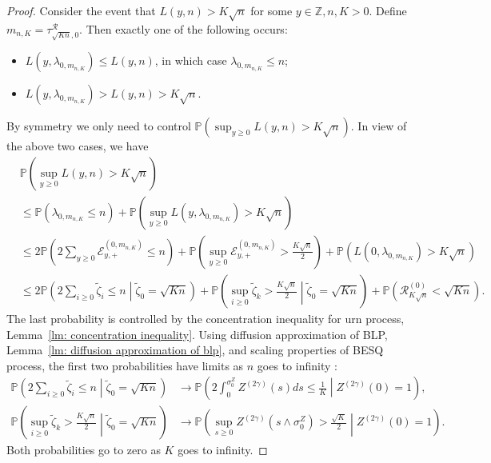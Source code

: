 \documentclass[EJP]{ejpecp} %
\begin{document}
\begin{proof}
	Consider the event that $L(y, n) > K \sqrt{n} $ for some $y \in \mathbb{Z}, n, K > 0$. Define $m_{n, K } = \tau^{\mathscr{R}}_{\sqrt{K n},0 }$. Then exactly one of the following occurs:
	\begin{itemize}
		\item $L(y, \lambda_{0, m_{n, K}}) \le L(y, n)$, in which case $\lambda_{0, m_{n, K}} \le  n$;
		\item $L(y, \lambda_{0, m_{n, K}}) >  L(y, n)  > K \sqrt{n} $.
	\end{itemize}
	By symmetry we only need to control $\mathbb{P}\left( \sup _{y \ge  0} L(y, n) > K \sqrt{n}  \right) $. In view of the above two cases, we have
	\begin{align*}
		&\mathbb{P}\left( \sup _{y \ge  0} L(y, n) > K \sqrt{n}  \right) \\
		&\le \mathbb{P}\left( \lambda_{0, m_{n, K}} \le n \right) + \mathbb{P}\left( \sup _{y \ge 0} L\left( y, \lambda_{0, m_{n, K}}\right)   > K \sqrt{n}  \right)  \\
		&\le 2\mathbb{P}\left( 2 \sum_{y \ge 0} \mathcal{E}_{y, +}^{(0,m_{n, K})} \le n \right) + \mathbb{P}\left( \sup _{y \ge 0} \mathcal{E}_{y,+}^{\left( 0,m_{n, K} \right) }   > \frac{K \sqrt{n} }{2}  \right)+ \mathbb{P}\left( L(0,\lambda_{0, m_{n, K}}) > K \sqrt{n}  \right)  \\
		&\le 
		2\mathbb{P}\left( 2 \sum_{i \ge  0} \tilde \zeta_i \le  n \middle| \tilde\zeta_0 = \sqrt{K n} \right) + 
		\mathbb{P}\left( \sup _{i \ge 0} \tilde \zeta_k > \frac{K \sqrt{n} }{2} \middle| \tilde \zeta_0 = \sqrt{K n}   \right)+ 
		\mathbb{P}\left( \mathscr{R}^{(0)} _{K \sqrt{n} } < \sqrt{K n}  \right) 
		.\end{align*}
	The last probability is controlled by the concentration inequality for urn process, Lemma~\ref{lm: concentration inequality}. Using diffusion approximation of BLP, Lemma~\ref{lm: diffusion approximation of blp}, and scaling properties of BESQ process, the first two probabilities have limits as $n$ goes to infinity :
	\begin{align*}
		\mathbb{P}\left( 2 \sum_{i \ge  0} \tilde \zeta_i \le  n \middle| \tilde\zeta_0 = \sqrt{K n} \right) 
		&\to 
		\mathbb{P}\left(2 \int _0^{\sigma_0^{Z}} Z^{(2 \gamma)}(s) d s \le \frac{1}{K} \middle| Z^{(2 \gamma)}(0) = 1 \right),\\
		\mathbb{P}\left( \sup _{i \ge 0} \tilde \zeta_k > \frac{K \sqrt{n} }{2} \middle| \tilde \zeta_0 = \sqrt{K n}   \right)
		&\to 
		\mathbb{P}\left( \sup_{s \ge 0} Z^{(2 \gamma)}(s \wedge \sigma_0^{Z}) > \frac{\sqrt{K} }{2} \middle| Z^{(2 \gamma)} (0) = 1 \right) 
		.\end{align*} 
	Both probabilities go to zero as $K$ goes to infinity. 
\end{proof}
\end{document}
